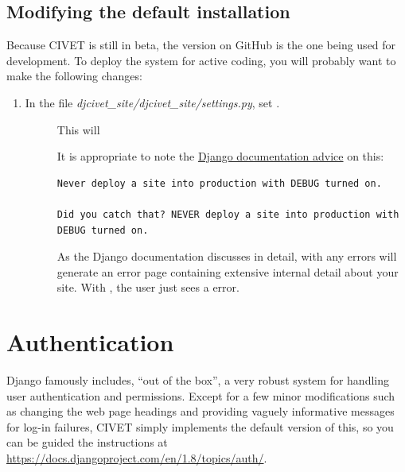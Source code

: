 \documentclass[letterpaper,10pt,english]{sphinxmanual}
\begin{document}
\section{Modifying the default installation}
\label{installing:modifying-the-default-installation}
Because CIVET is still in beta, the version on GitHub is the one being used for
development. To deploy the system for active coding, you will probably want
to make the following changes:
\begin{enumerate}
\item {} \begin{description}
\item[{In the file \emph{djcivet\_site/djcivet\_site/settings.py}, set .}] \leavevmode
This will

It is appropriate to note the \href{https://docs.djangoproject.com/en/1.8/ref/settings/}{Django documentation advice}
on this:

\begin{Verbatim}[commandchars=\\\{\}]
Never deploy a site into production with DEBUG turned on.

Did you catch that? NEVER deploy a site into production with DEBUG turned on.
\end{Verbatim}

As the Django documentation discusses in detail, with  any
errors will generate an error page containing extensive internal detail
about your site. With , the user just sees a 
error.

\end{description}

\end{enumerate}


\chapter{Authentication}
\label{authentication:authentication}\label{authentication::doc}
Django famously includes, ``out of the box'', a very robust system for handling user authentication and permissions. Except
for a few minor modifications such as changing the web page headings and providing vaguely informative messages for log-in
failures, CIVET simply implements the default version of this, so you can be guided the instructions at
\href{https://docs.djangoproject.com/en/1.8/topics/auth/}{https://docs.djangoproject.com/en/1.8/topics/auth/}.
\end{document}
